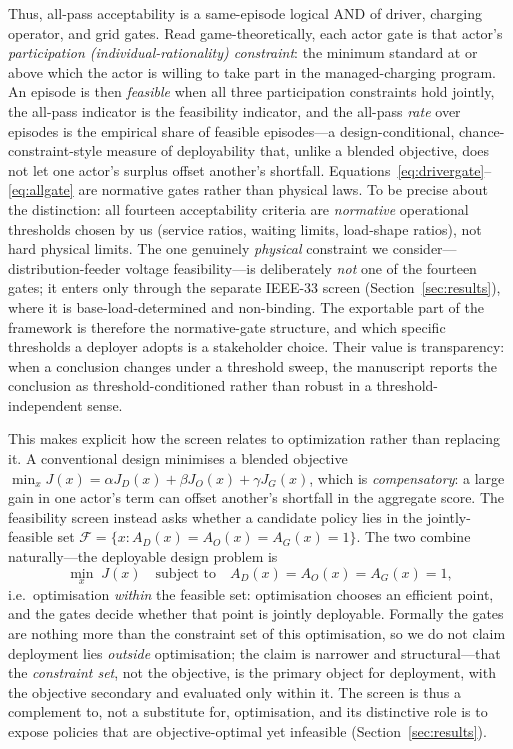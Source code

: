 \documentclass[12pt]{article}
\begin{document}
Thus, all-pass acceptability is a same-episode logical AND of driver, charging operator, and grid gates. Read game-theoretically, each actor gate is that actor's \emph{participation (individual-rationality) constraint}: the minimum standard at or above which the actor is willing to take part in the managed-charging program. An episode is then \emph{feasible} when all three participation constraints hold jointly, the all-pass indicator is the feasibility indicator, and the all-pass \emph{rate} over episodes is the empirical share of feasible episodes---a design-conditional, chance-constraint-style measure of deployability that, unlike a blended objective, does not let one actor's surplus offset another's shortfall. Equations~\eqref{eq:drivergate}--\eqref{eq:allgate} are normative gates rather than physical laws. To be precise about the distinction: all fourteen acceptability criteria are \emph{normative} operational thresholds chosen by us (service ratios, waiting limits, load-shape ratios), not hard physical limits. The one genuinely \emph{physical} constraint we consider---distribution-feeder voltage feasibility---is deliberately \emph{not} one of the fourteen gates; it enters only through the separate IEEE-33 screen (Section~\ref{sec:results}), where it is base-load-determined and non-binding. The exportable part of the framework is therefore the normative-gate structure, and which specific thresholds a deployer adopts is a stakeholder choice. Their value is transparency: when a conclusion changes under a threshold sweep, the manuscript reports the conclusion as threshold-conditioned rather than robust in a threshold-independent sense.

This makes explicit how the screen relates to optimization rather than replacing it. A conventional design minimises a blended objective $\min_x J(x)=\alpha J_D(x)+\beta J_O(x)+\gamma J_G(x)$, which is \emph{compensatory}: a large gain in one actor's term can offset another's shortfall in the aggregate score. The feasibility screen instead asks whether a candidate policy lies in the jointly-feasible set $\mathcal{F}=\{x: A_D(x)=A_O(x)=A_G(x)=1\}$. The two combine naturally---the deployable design problem is
\begin{equation}
\min_x\; J(x)\quad\text{subject to}\quad A_D(x)=A_O(x)=A_G(x)=1,
\label{eq:optwithin}
\end{equation}
i.e.\ optimisation \emph{within} the feasible set: optimisation chooses an efficient point, and the gates decide whether that point is jointly deployable. Formally the gates are nothing more than the constraint set of this optimisation, so we do not claim deployment lies \emph{outside} optimisation; the claim is narrower and structural---that the \emph{constraint set}, not the objective, is the primary object for deployment, with the objective secondary and evaluated only within it. The screen is thus a complement to, not a substitute for, optimisation, and its distinctive role is to expose policies that are objective-optimal yet infeasible (Section~\ref{sec:results}).
\end{document}
